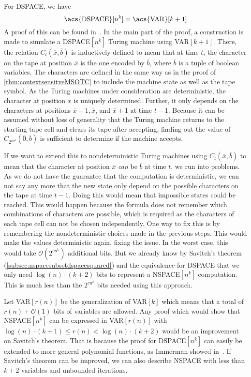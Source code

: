For \acs{DSPACE}, we have
\[
    \text{\acs{DSPACE}}[n^k] = \text{\acs{VAR}}[k + 1]
\]
A proof of this can be found in~\cite{descriptive-complexity}.
In the main part of the proof, a construction is made to simulate a \acs{DSPACE}$[n^k]$ Turing machine using \acs{VAR}$[k + 1]$.
There, the relation $C_{t}(\overline{x}, \overline{b})$ is inductively defined to mean that at time $t$, the character on the tape at position $\overline{x}$ is the one encoded by $\overline{b}$, where $\overline{b}$ is a tuple of boolean variables.
The characters are defined in the same way as in the proof of \cref{thm:contextsensitveMSOTC} to include the machine state as well as the tape symbol.
As the Turing machines under consideration are deterministic, the character at position $\overline{x}$ is uniquely determined.
Further, it only depends on the characters at positions $\overline{x} - 1, \overline{x}$, and $\overline{x} + 1$ at time $t - 1$.
Because it can be assumed without loss of generality that the Turing machine returns to the starting tape cell and clears its tape after accepting, finding out the value of $C_{2^{cn^k}}(\overline{0}, \overline{b})$ is sufficient to determine if the machine accepts.

If we want to extend this to nondeterministic Turing machines using $C_{t}(\overline{x}, \overline{b})$ to mean that the character at position $\overline{x}$ \emph{can} be $\overline{b}$ at time $t$, we run into problems.
As we do not have the guarantee that the computation is deterministic, we can not say any more that the new state only depend on the possible characters on the tape at time $t - 1$.
Doing this would mean that impossible states could be reached.
This would happen because the formula does not remember which combinations of characters are possible, which is required as the characters of each tape cell can not be chosen independently.
One way to fix this is by remembering the nondeterministic choices made in the previous steps.
This would make the values deterministic again, fixing the issue.
In the worst case, this would take $\mathcal{O}(2^{cn^k})$ additional bits.
But we already know by Savitch's theorem (\cref{subsec:nspacesubsetdspacesquared}) and the equivalence for \acs{DSPACE} that we only need $\log(n) \cdot (k + 2)$ bits to represent a \acs{NSPACE}$[n^k]$ computation.
This is much less than the $2^{cn^k}$ bits needed using this approach.

Let \acs{VAR}$[r(n)]$ be the generalization of \acs{VAR}$[k]$ which means that a total of $r(n) + \mathcal{O}(1)$ bits of variables are allowed.
Any proof which would show that \acs{NSPACE}$[n^k]$ can be expressed in \acs{VAR}$[r(n)]$ with $\log(n) \cdot (k + 1) \leq r(n) < \log(n) \cdot (k + 2)$ would be an improvement on Savitch's theorem.
That is because the proof for \acs{DSPACE}$[n^k]$ can easily be extended to more general polynomial functions, as Immerman showed in~\cite{Immerman1999}.
If Savitch's theorem can be improved, we can also describe \acs{NSPACE} with less than $k + 2$ variables and unbounded iterations.


